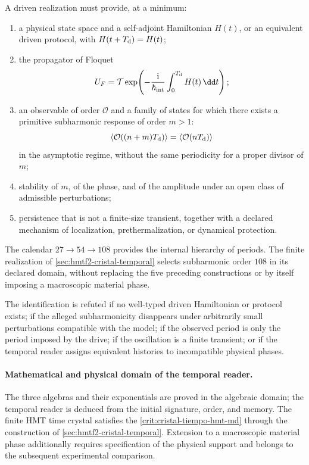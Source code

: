 A driven realization must provide, at a minimum:
\begin{enumerate}
 \item a physical state space and a self-adjoint Hamiltonian
 \(H(t)\), or an equivalent driven protocol, with
 \(H(t+T_{\rm d})=H(t)\);
 \item the propagator of Floquet
 \[
  U_F=\mathcal T\exp\!\left(
  -\frac{\mathrm i}{\hbar_{\rm int}}
  \int_0^{T_{\rm d}}H(t)\,\dd t\right);
 \]
 \item an observable of order \(\mathcal O\) and a family of states for
 which there exists a primitive subharmonic response of order \(m>1\):
 \[
  \langle\mathcal O((n+m)T_{\rm d})\rangle
  =\langle\mathcal O(nT_{\rm d})\rangle
 \]
 in the asymptotic regime, without the same periodicity for a proper divisor
 of \(m\);
 \item stability of \(m\), of the phase, and of the amplitude under an open
 class of admissible perturbations;
 \item persistence that is not a finite-size transient, together with a
 declared mechanism of localization, prethermalization, or dynamical
 protection.
\end{enumerate}
The calendar \(27\to54\to108\) provides the internal hierarchy of periods. The
finite realization of \cref{sec:hmtf2-cristal-temporal} selects subharmonic order
\(108\) in its declared domain, without replacing the five preceding
constructions or by itself imposing a macroscopic material phase.

\begin{criterion}
\label{crit:cristal-tiempo-hmt-md}
The identification is refuted if no well-typed driven Hamiltonian or protocol
exists; if the alleged subharmonicity disappears under
arbitrarily small perturbations compatible with the model; if the
observed period is only the period imposed by the drive; if the
oscillation is a finite transient; or if the temporal reader assigns equivalent
histories to incompatible physical phases.
\end{criterion}

\paragraph{Mathematical and physical domain of the temporal reader.}
The three algebras and their exponentials are proved in the algebraic domain; the temporal reader is deduced from the initial signature, order, and memory. The finite HMT time crystal satisfies the \cref{crit:cristal-tiempo-hmt-md} through the construction of \cref{sec:hmtf2-cristal-temporal}. Extension to a macroscopic material phase additionally requires specification of the physical support and belongs to the subsequent experimental comparison.
